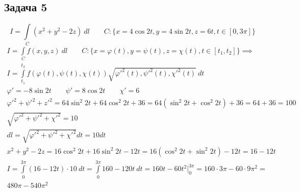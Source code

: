 \documentclass[a4paper,fleqn,12pt]{article}
\theoremstyle{definition}
\begin{document}
\subsection*{Задача 5}
$$I = \int\limits_C (x^2 + y^2 - 2z) \ dl \qquad C: \{x= 4\cos 2t , y = 4\sin 2t, z = 6t, t \in [0,3\pi] \}$$
\begin{gather*}
I = \int\limits_C f(x,y,z) \ dl \qquad C: \{x = \varphi(t), y=\psi(t), z=\chi(t), t \in [t_1, t_2] \} \implies \\
I = \int\limits_{t_1} ^{t_2} f(\varphi(t), \psi(t), \chi(t)) \sqrt{\varphi'^2(t), \psi'^2(t), \chi'^2(t)} \ dt  \\
\varphi' = -8\sin 2t \qquad \psi' = 8\cos 2t \qquad \chi' = 6 \\
\varphi'^2 + \psi'^2 + z'^2 = 64\sin^2 2t + 64 \cos^2 2t + 36 = 64 (\sin^2 2t + \cos^2 2t) + 36 = 64 + 36 = 100 \\
\sqrt{\varphi'^2 + \psi'^2 + \chi'^2} = 10 \\
dl = \sqrt{\varphi'^2 + \psi'^2 + \chi'^2} dt = 10 dt \\
x^2 + y^2 - 2z = 16\cos^2 2t + 16 \sin^2 2t - 12t = 16(\cos^2 2t + \sin^2 2t) - 12t = 16 - 12t \\
I = \int\limits_0 ^{3\pi} (16 - 12t) \cdot 10 \ dt = \int\limits_0 ^{3\pi} 160 - 120t \ dt = 160t - 60t^2 \Big|_0 ^{3\pi} = 160\cdot 3\pi - 60 \cdot 9\pi^2 = \\
480\pi - 540 \pi^2 
\end{gather*}
\end{document}
